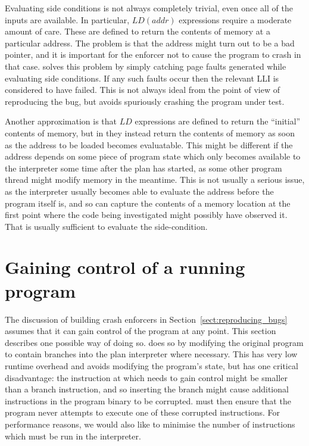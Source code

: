 Evaluating side conditions is not always completely trivial, even once
all of the inputs are available.  In particular, $LD(addr)$
expressions require a moderate amount of care.  These are defined to
return the contents of memory at a particular address.  The problem is
that the address might turn out to be a bad pointer, and it is
important for the enforcer not to cause the program to crash in that
case.  {\Implementation} solves this problem by simply catching page
faults generated while evaluating side conditions.  If any such faults
occur then the relevant LLI is considered to have failed.  This is not
always ideal from the point of view of reproducing the bug, but avoids
spuriously crashing the program under test.


Another approximation is that $LD$ expressions are defined to return
the ``initial'' contents of memory, but in {\implementation} they
instead return the contents of memory as soon as the address to be
loaded becomes evaluatable.  This might be different if the address
depends on some piece of program state which only becomes available to
the interpreter some time after the plan has started, as some other
program thread might modify memory in the meantime.  This is not
usually a serious issue, as the interpreter usually becomes able to
evaluate the address before the program itself is, and so can capture
the contents of a memory location at the first point where the code
being investigated might possibly have observed it.  That is usually
sufficient to evaluate the side-condition. 

\section{Gaining control of a running program}
\label{sect:enforce:gain_control}

The discussion of building crash enforcers in
Section~\ref{sect:reproducing_bugs} assumes that it can gain control
of the program at any point.  This section describes one possible way
of doing so.  {\Implementation} does so by modifying the original
program to contain branches into the plan interpreter where necessary.
This has very low runtime overhead and avoids modifying the program's
state, but has one critical disadvantage:
the instruction at which {\implementation} needs to gain control might
be smaller than a branch instruction, and so inserting the branch
might cause additional instructions in the program binary to be
corrupted.  {\Implementation} must then ensure that the program never
attempts to execute one of these corrupted instructions.  For
performance reasons, we would also like to minimise the number of
instructions which must be run in the interpreter.

